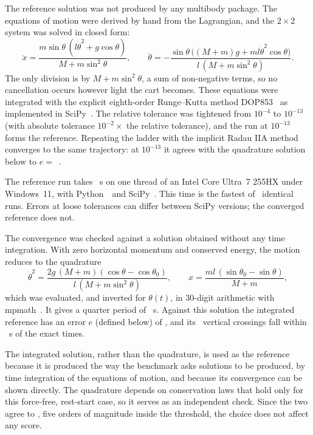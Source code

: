 \documentclass[11pt,a4paper]{article}
\begin{document}
The reference solution was not produced by any multibody package. The equations of
motion were derived by hand from the Lagrangian, and the $2\times2$ system was
solved in closed form:
\begin{equation}
\ddot x = \frac{m\sin\theta\,(l\dot\theta^2 + g\cos\theta)}{M + m\sin^2\theta},
\qquad
\ddot\theta = -\frac{\sin\theta\,\big((M+m)g + ml\dot\theta^2\cos\theta\big)}{l\,(M + m\sin^2\theta)}.
\end{equation}
The only division is by $M + m\sin^2\theta$, a sum of non-negative terms, so no
cancellation occurs however light the cart becomes. These equations were integrated
with the explicit eighth-order Runge--Kutta method DOP853~\cite{hairer1} as
implemented in SciPy~\cite{scipy}. The relative tolerance was tightened from
$10^{-4}$ to $10^{-13}$ (with absolute tolerance $10^{-2}\times$ the relative
tolerance), and the run at $10^{-13}$ forms the reference. Repeating the ladder with
the implicit Radau IIA method~\cite{hairer2} converges to the same trajectory: at
$10^{-13}$ it agrees with the quadrature solution below to $e =$~\ERadau.

The reference run takes \RefCPU~s on one thread of an Intel Core Ultra~7 255HX
under Windows~11, with Python~\PythonVersion\ and SciPy~\ScipyVersion. This time is
the fastest of \Reps\ identical runs. Errors at loose tolerances can differ between
SciPy versions; the converged reference does not.

The convergence was checked against a solution obtained without any time
integration. With zero horizontal momentum and conserved energy, the motion reduces
to the quadrature
\begin{equation}
\dot\theta^2 = \frac{2g\,(M+m)(\cos\theta - \cos\theta_0)}{l\,(M + m\sin^2\theta)},
\qquad
x = \frac{ml\,(\sin\theta_0 - \sin\theta)}{M+m},
\end{equation}
which was evaluated, and inverted for $\theta(t)$, in 30-digit arithmetic with
mpmath~\cite{mpmath}. It gives a quarter period of \Qperiod~s. Against this solution
the integrated reference has an error $e$ (defined below) of \Equad, and its
\Ncross~vertical crossings fall within \CrossErr~s of the exact times.

The integrated solution, rather than the quadrature, is used as the reference
because it is produced the way the benchmark asks solutions to be produced, by
time integration of the equations of motion, and because its convergence can be
shown directly. The quadrature depends on conservation laws that hold only for
this force-free, rest-start case, so it serves as an independent check. Since the
two agree to \Equad, five orders of magnitude inside the threshold, the choice does
not affect any score.
\end{document}
